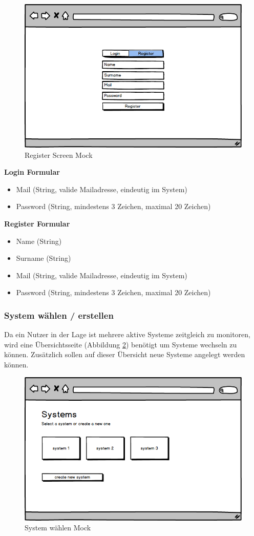 \begin{figure}[h]
 \centering
 \includegraphics[width=0.7\linewidth]{kapitel1/mocks/Register.png}
 \caption{Register Screen Mock}
  \label{fig:register}
\end{figure}


\textbf{Login Formular}
\begin{itemize}
\item Mail (String, valide Mailadresse, eindeutig im System)
\item Password (String, mindestens 3 Zeichen, maximal 20 Zeichen)
\end{itemize}

\textbf{Register Formular}
\begin{itemize}
\item Name (String)
\item Surname (String)
\item Mail (String, valide Mailadresse, eindeutig im System)
\item Password (String, mindestens 3 Zeichen, maximal 20 Zeichen)
\end{itemize}



\subsubsection{System wählen / erstellen}

Da ein Nutzer in der Lage ist mehrere aktive Systeme zeitgleich zu monitoren,
wird eine Übersichtsseite (Abbildung \ref{fig:system-picker}) benötigt
um Systeme wechseln zu können. Zusätzlich sollen auf dieser Übersicht
neue Systeme angelegt werden können.

\begin{figure}[h]
 \centering
 \includegraphics[width=0.6\linewidth]{kapitel1/mocks/system-picker.png}
 \caption{System wählen Mock}
 \label{fig:system-picker}
\end{figure}

